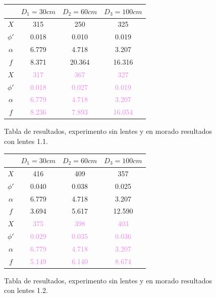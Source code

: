 \documentclass[conference]{IEEEtran}
\begin{document}
\begin{figure}[htbp]
\centering

\begin{tabular}{c|c|c|c|}
	 & $D_1=30cm$ & $D_2=60cm$ & $D_3=100 cm$\\
	\hline
	$X$ & 315 & 250 & 325\\
	\hline
	$\phi'$ & 0.018 & 0.010 & 0.019\\
	\hline
	$\alpha$ & 6.779 & 4.718 & 3.207\\
	\hline
	$f$ & 8.371 & 20.364 & 16.316\\
	\hline

	$X$ & \textcolor{violet}{317} & \textcolor{violet}{367} & \textcolor{violet}{327}\\
	\hline
	$\phi'$ & \textcolor{violet}{0.018} & \textcolor{violet}{0.027} & \textcolor{violet}{0.019}\\
	\hline
	$\alpha$ & \textcolor{violet}{6.779} & \textcolor{violet}{4.718} & \textcolor{violet}{3.207}\\
	\hline
	$f$ & \textcolor{violet}{8.236} & \textcolor{violet}{7.893} & \textcolor{violet}{16.054}\\
	\hline

\end{tabular}

\caption{Tabla de resultados, experimento sin lentes y en morado resultados con lentes 1.1.}
\label{res1.1}
\end{figure}


\begin{figure}[htbp]
\centering

\begin{tabular}{c|c|c|c|}
	 & $D_1=30cm$ & $D_2=60cm$ & $D_3=100 cm$\\
	\hline
	$X$ & 416 & 409 & 357\\
	\hline
	$\phi'$ & 0.040 & 0.038 & 0.025\\
	\hline
	$\alpha$ & 6.779 & 4.718 & 3.207\\
	\hline
	$f$ & 3.694 & 5.617 & 12.590\\
	\hline

	$X$ & \textcolor{violet}{375} & \textcolor{violet}{398} & \textcolor{violet}{403}\\
	\hline
	$\phi'$ & \textcolor{violet}{0.029} & \textcolor{violet}{0.035} & \textcolor{violet}{0.036}\\
	\hline
	$\alpha$ & \textcolor{violet}{6.779} & \textcolor{violet}{4.718} & \textcolor{violet}{3.207}\\
	\hline
	$f$ & \textcolor{violet}{5.149} & \textcolor{violet}{6.140} & \textcolor{violet}{8.674}\\
	\hline

\end{tabular}

\caption{Tabla de resultados, experimento sin lentes y en morado resultados con lentes 1.2.}
\label{res1.2}
\end{figure}
\end{document}
